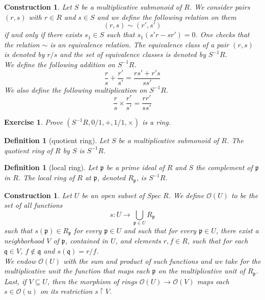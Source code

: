 \documentclass[12pt]{report}
\newtheorem{definition}[proposition]{Definition}
\newtheorem{ex}[proposition]{Exercise}
\newtheorem{cons}[proposition]{Construction}
\begin{document}
\begin{cons}
	Let $S$ be a multiplicative submonoid of $R$. We consider pairs $(r, s)$ with $r \in R$ and $s \in S$ and we define the following relation on them
	\[
	(r, s) \sim (r', s')
	\]
	if and only if there exists $s_1 \in S$ such that $s_1(s' r - s r') = 0$. One checks that the relation $\sim$ is an equivalence relation. The equivalence class of a pair $(r, s)$ is denoted by $r/s$ and the set of equivalence classes is denoted by $S^{-1} R$. \\
	We define the following addition on $S^{-1} R$.
	\[
	\frac{r}{s} + \frac{r'}{s'} = \frac{r s' + r' s}{s s'}
	\]
	We also define the following multiplication on $S^{-1} R$. 
	\[
	\frac{r}{s} \times \frac{r'}{s'} = \frac{r r'}{s s'}
	\]
\end{cons}

\begin{ex}
	Prove $(S^{-1} R, 0/1, +, 1/1, \times)$ is a ring.
\end{ex}		

\begin{definition}[quotient ring]
	Let $S$ be a multiplicative submonoid of $R$. The quotient ring of $R$ by $S$ is $S^{-1} R$. 
\end{definition}

\begin{definition}[local ring]
Let $\mathfrak{p}$ be a prime ideal of $R$ and $S$ the complement of $\mathfrak{p}$ in $R$. The local ring of $R$ at $\mathfrak{p}$, denoted $R_{\mathfrak{p}}$, is $S^{-1} R$. 	
\end{definition}

\begin{cons}
	Let $U$ be an open subset of Spec $R$. We define $\mathscr{O}(U)$ to be the set of all functions 
	\[
	s: U \rightarrow \bigcup \limits_{\mathfrak{p} \in U} R_{\mathfrak{p}}
	\]
	such that $s(\mathfrak{p}) \in R_{\mathfrak{p}}$ for every $\mathfrak{p} \in U$ and such that for every $\mathfrak{p} \in U$, there exist a neighborhood $V$ of $\mathfrak{p}$, contained in $U$, and elements $r, f \in R$, such that for each $\mathfrak{q} \in V$, $f \notin \mathfrak{q}$ and $s(\mathfrak{q}) = r/f$. \\
	We endow $\mathscr{O}(U)$ with the sum and product of such functions and we take for the multiplicative unit the function that maps each $\mathfrak{p}$ on the multiplicative unit of $R_{\mathfrak{p}}$. \\
	Last, if $V \subseteq U$, then the morphism of rings $\mathscr{O}(U) \rightarrow \mathscr{O}(V)$ maps each $s \in \mathscr{O}(u)$ on its restriction $s \restriction V$. 
\end{cons}
\end{document}

